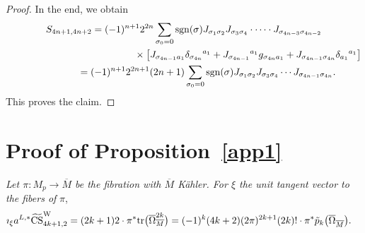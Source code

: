 \documentclass[pdftex]{sigma}
\numberwithin{equation}{section}
\theoremstyle{definition}
\newcommand{\tr}{{\rm tr}}
\newcommand{\bo}{\overline\Omega}
\newcommand{\bom}{\bo_{\overline M}}
\newcommand{\bxi}{\xi}
\newcommand{\ocs}{\widetilde{{\rm CS}}}
\newcommand{\sgn}{{\rm sgn}}
\newcommand{\om}{\overline{M}}
\newcommand{\omp}{M_p}
\begin{document}
\begin{proof}
In the end, we obtain
\begin{gather}
{S_{4n+1,4n+2}} =(-1)^{n+1} 2^{2n}
\sum_{\sigma_0=0} \sgn (\sigma)
J_{\sigma_1 \sigma_2} J_{\sigma_3 \sigma_4} \cdot\dots\cdot
J_{\sigma_{4n-3} \sigma_{4n-2}}
 \nonumber\\
 \hphantom{{S_{4n+1,4n+2}} =(-1)^{n+1} 2^{2n}
\sum_{\sigma_0=0}}{}
\times \bigl[J_{\sigma_{4n-1} a_1} \delta_{\sigma_{4n}}{}^{a_1}
+J_{\sigma_{4n-1}}{}^{a_1}g_{\sigma_{4n} a_{1}}+J_{\sigma_{4n-1} \sigma_{4n}} \delta_{a_1}{}^{a_1} \bigr]\nonumber\\
\hphantom{{S_{4n+1,4n+2}}}{}
=(-1)^{n+1}2^{2n+1}(2n+1)
\sum_{\sigma_0=0} \sgn (\sigma)
J_{\sigma_1 \sigma_2} J_{\sigma_3 \sigma_4} \cdots
J_{\sigma_{4n-1} \sigma_{4n}}.\label{3.5add12}
\end{gather}
This proves the claim.
\end{proof}



\section{Proof of Proposition~\ref{app1}}\label{app:E}


 {\em Let $\pi\colon \omp\to \om$ be the fibration with $\om$ K\"ahler. For $\bxi$ the unit tangent vector to the fibers of }
$\pi$,
\begin{align*}\imath_{\bxi} a^{L,*}\ocs^{\rm W}_{4k+1,2} &=
(2k+1)2\cdot \pi^*\tr\bigl(\bom^{2k}\bigr)
=
(-1)^k (4k+2)(2\pi)^{2k+1}(2k)!
\cdot \pi^*\tilde p_k\bigl(\bom\bigr).
\end{align*}
\end{document}

